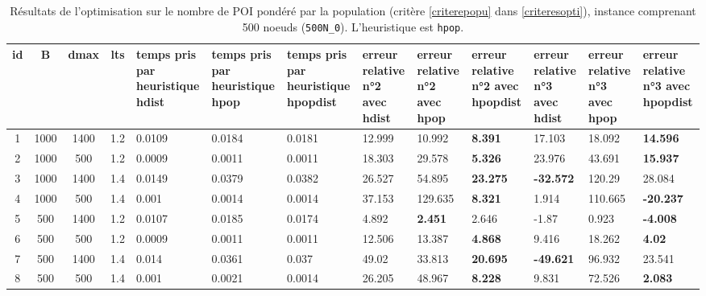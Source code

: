 \begin{sidewaystable}
    \vspace{2\baselineskip}
    \caption{Résultats de l'optimisation sur le nombre de POI pondéré par la population (critère \ref{criterepopu} dans \ref{criteresopti}), instance comprenant 500 noeuds (\texttt{500N\_0}). L'heuristique est \texttt{hpop}.}
    \label{tab:compa_hpop}
    \begin{tabular}{|c|c|c|c|p{1.5cm}|p{1.5cm}|p{1.5cm}||p{2cm}|p{2cm}|p{2cm}||p{2cm}|p{2cm}|p{2cm}|}
    \hline
    id & B & dmax & lts & temps pris par
    heuristique hdist & temps pris par
    heuristique hpop & temps pris par
    heuristique hpopdist & erreur relative n°2 avec hdist & erreur relative n°2 avec hpop & erreur relative n°2 avec hpopdist & erreur relative n°3 avec hdist & erreur relative n°3 avec hpop & erreur relative n°3 avec hpopdist \\
    \hline
    1 & 1000 & 1400 & 1.2 & 0.0109 & 0.0184 & 0.0181 & 12.999 & 10.992 & \textbf{8.391} & 17.103 & 18.092 & \textbf{14.596} \\
    2 & 1000 & 500 & 1.2 & 0.0009 & 0.0011 & 0.0011 & 18.303 & 29.578 & \textbf{5.326} & 23.976 & 43.691 & \textbf{15.937} \\
    3 & 1000 & 1400 & 1.4 & 0.0149 & 0.0379 & 0.0382 & 26.527 & 54.895 & \textbf{23.275} & \textbf{-32.572} & 120.29 & 28.084 \\
    4 & 1000 & 500 & 1.4 & 0.001 & 0.0014 & 0.0014 & 37.153 & 129.635 & \textbf{8.321} & 1.914 & 110.665 & \textbf{-20.237} \\
    5 & 500 & 1400 & 1.2 & 0.0107 & 0.0185 & 0.0174 & 4.892 & \textbf{2.451} & 2.646 & -1.87 & 0.923 & \textbf{-4.008} \\
    6 & 500 & 500 & 1.2 & 0.0009 & 0.0011 & 0.0011 & 12.506 & 13.387 & \textbf{4.868} & 9.416 & 18.262 & \textbf{4.02} \\
    7 & 500 & 1400 & 1.4 & 0.014 & 0.0361 & 0.037 & 49.02 & 33.813 & \textbf{20.695} & \textbf{-49.621} & 96.932 & 23.541 \\
    8 & 500 & 500 & 1.4 & 0.001 & 0.0021 & 0.0014 & 26.205 & 48.967 & \textbf{8.228} & 9.831 & 72.526 & \textbf{2.083} \\
    \hline
    \end{tabular}


\end{sidewaystable}

